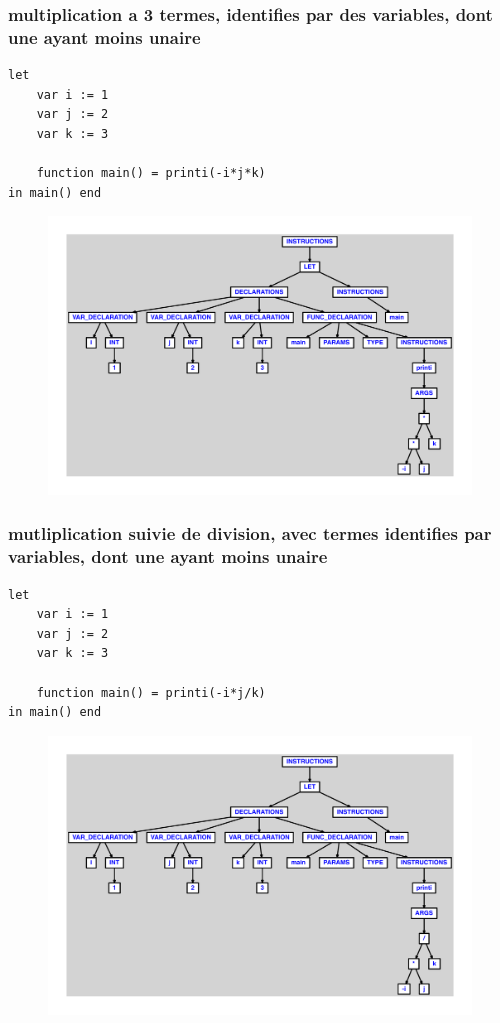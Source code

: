 \documentclass{article}
\begin{document}
\subsubsection{multiplication a 3 termes, identifies par des variables, dont une ayant moins unaire}
\begin{lstlisting}
let
	var i := 1
	var j := 2
	var k := 3

	function main() = printi(-i*j*k)
in main() end
\end{lstlisting}
\newpage
\begin{figure}[H]
\centering
\includegraphics[max width=\textwidth]{ast/ast_85.pdf}
\end{figure}
\newpage
\subsubsection{mutliplication suivie de division, avec termes identifies par variables, dont une ayant moins unaire}
\begin{lstlisting}
let
	var i := 1
	var j := 2
	var k := 3

	function main() = printi(-i*j/k)
in main() end
\end{lstlisting}
\newpage
\begin{figure}[H]
\centering
\includegraphics[max width=\textwidth]{ast/ast_86.pdf}
\end{figure}
\newpage
\end{document}
